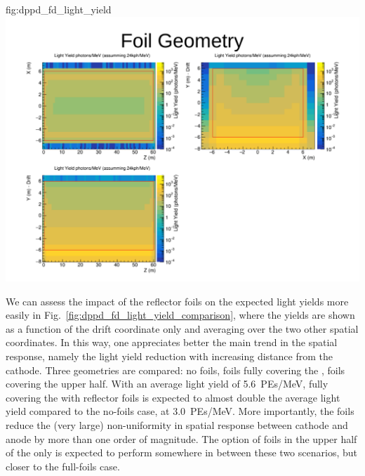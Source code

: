 \begin{dunefigure}{fig:dppd_fd_light_yield}
\includegraphics[trim={14cm 9.5cm 1cm 3.5cm}, clip, height=0.22\textheight]{graphics/dppd_fd_light_yield_fullfoil.pdf}
\end{dunefigure}

We can assess the impact of the  reflector foils on the expected light yields more easily in Fig.~\ref{fig:dppd_fd_light_yield_comparison}, where the yields are shown as a function of the drift coordinate only and averaging over the two other spatial coordinates. In this way, one appreciates better the main trend in the spatial response, namely the light yield reduction with increasing distance from the cathode. Three geometries are compared: no foils, foils fully covering the , foils covering the upper  half. With an average light yield of \SI{5.6}{PEs/MeV}, fully covering the  with  reflector foils is expected to almost double the average light yield compared to the no-foils case, at \SI{3.0}{PEs/MeV}. More importantly, the foils reduce the (very large) non-uniformity in spatial response between cathode and anode by more than one order of magnitude. The option of foils in the upper half of the  only is expected to perform somewhere in between these two scenarios, but closer to the full-foils case.

